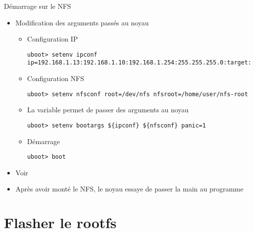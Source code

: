 \begin{frame}[fragile=singleslide]{Démarrage sur le NFS}
  \begin{itemize}
  \item Modification des arguments passés au noyau
    \begin{itemize}
    \item Configuration IP
      \begin{lstlisting}
uboot> setenv ipconf ip=192.168.1.13:192.168.1.10:192.168.1.254:255.255.255.0:target:eth0:off
      \end{lstlisting}
    \item Configuration NFS
      \begin{lstlisting}
uboot> setenv nfsconf root=/dev/nfs nfsroot=/home/user/nfs-root
      \end{lstlisting}
    \item La variable  permet de passer des arguments au noyau
      \begin{lstlisting}
uboot> setenv bootargs ${ipconf} ${nfsconf} panic=1
      \end{lstlisting}
    \item Démarrage
      \begin{lstlisting}
uboot> boot
      \end{lstlisting}
    \end{itemize}
  \item Voir 
  \item Après avoir monté le NFS, le noyau essaye de passer la main au
    programme 
  \end{itemize}
\end{frame}

\section{Flasher le rootfs}

